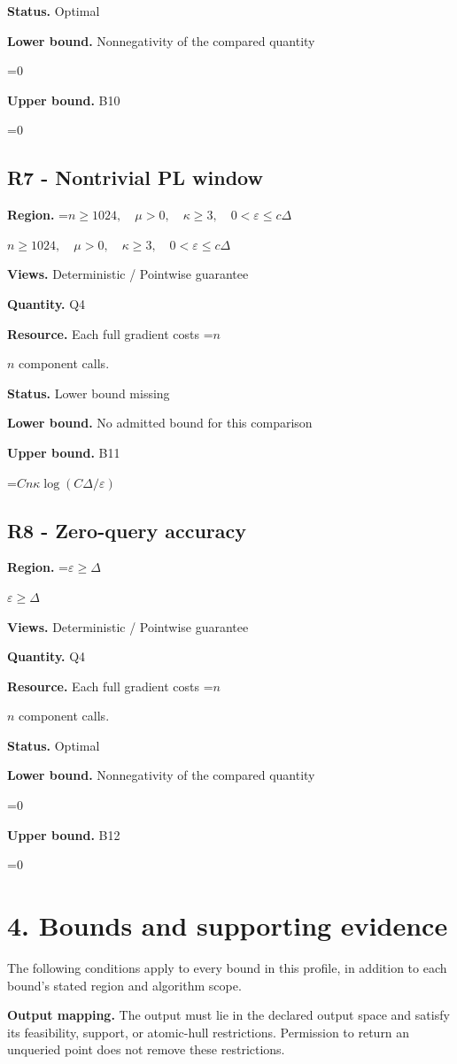\documentclass[10pt,a4paper]{article}
\newcommand{\AtlasMath}[1]{\par\begingroup\centering\setbox0=\hbox{$\displaystyle #1$}\ifdim\wd0>1.4\linewidth\typeout{ATLAS WIDE FORMULA: \the\wd0}\fi\ifdim\wd0>\linewidth\resizebox{\linewidth}{!}{\box0}\else\box0\fi\par\endgroup}
\newcommand{\AtlasInlineMath}[1]{\begingroup\setbox0=\hbox{$#1$}\ifdim\wd0>.4\linewidth\endgroup\AtlasMath{#1}\else\endgroup$#1$\fi}
\begin{document}
\textbf{Status.} Optimal

\textbf{Lower bound.} Nonnegativity of the compared quantity

\AtlasMath{0}
\textbf{Upper bound.} B10

\AtlasMath{0}
\subsection{R7 - Nontrivial PL window}
\textbf{Region.} \AtlasInlineMath{n\ge1024,\quad\mu>0,\quad\kappa\ge3,\quad0<\varepsilon\le c\Delta}

\textbf{Views.} Deterministic / Pointwise guarantee

\textbf{Quantity.} Q4

\textbf{Resource.} Each full gradient costs \AtlasInlineMath{n} component calls.

\textbf{Status.} Lower bound missing

\textbf{Lower bound.} No admitted bound for this comparison

\textbf{Upper bound.} B11

\AtlasMath{Cn\kappa\log(C\Delta/\varepsilon)}
\subsection{R8 - Zero-query accuracy}
\textbf{Region.} \AtlasInlineMath{\varepsilon\ge\Delta}

\textbf{Views.} Deterministic / Pointwise guarantee

\textbf{Quantity.} Q4

\textbf{Resource.} Each full gradient costs \AtlasInlineMath{n} component calls.

\textbf{Status.} Optimal

\textbf{Lower bound.} Nonnegativity of the compared quantity

\AtlasMath{0}
\textbf{Upper bound.} B12

\AtlasMath{0}
\section{4. Bounds and supporting evidence}
The following conditions apply to every bound in this profile, in addition to each bound's stated region and algorithm scope.

\textbf{Output mapping.} The output must lie in the declared output space and satisfy its feasibility, support, or atomic-hull restrictions. Permission to return an unqueried point does not remove these restrictions.
\end{document}

